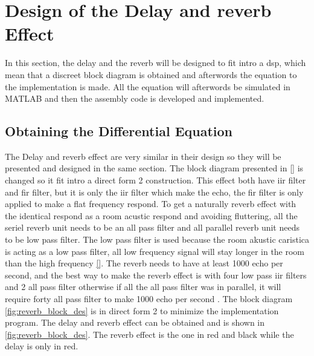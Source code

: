\section{Design of the Delay and \gls{reverb} Effect}
In this section, the delay and the \gls{reverb} will be designed to fit intro a \gls{dsp}, which mean that a discreet block diagram is obtained and afterwords the equation to the implementation is made. All the equation will afterwords be simulated in MATLAB and then the assembly code is developed and implemented. 


\subsection{Obtaining the Differential Equation}
The Delay and \gls{reverb} effect are very similar in their design so they will be presented and designed in the same section. The block diagram presented in \autoref{} is changed so it fit intro a direct form 2 construction. This effect both have \gls{iir} filter and \gls{fir} filter, but it is only the \gls{iir} filter which make the echo, the \gls{fir} filter is only applied to make a flat frequency respond. To get a naturally \gls{reverb} effect with the identical respond as a room acustic respond and avoiding fluttering, all the seriel \gls{reverb} unit needs to be an all pass filter and all parallel \gls{reverb} unit needs to be low pass filter. The low pass filter is used because the room akustic caristica is acting as a low pass filter, all low frequency signal will stay longer in the room than the high frequency \autoref{}.  The \gls{reverb} needs to have at least 1000 echo per second, and the best way to make the \gls{reverb} effect is with four low pass \gls{iir} filters and 2 all pass filter otherwise if all the all pass filter was in parallel, it will require forty all pass filter to make 1000 echo per second \citep{natural_sounding_revorb}. The block diagram \autoref{fig:reverb_block_des} is in direct form 2 to minimize the implementation program. The delay and \gls{reverb} effect can be obtained and is shown in \autoref{fig:reverb_block_des}. The \gls{reverb} effect is the one in red and black while the delay is only in red. 

\newpage

